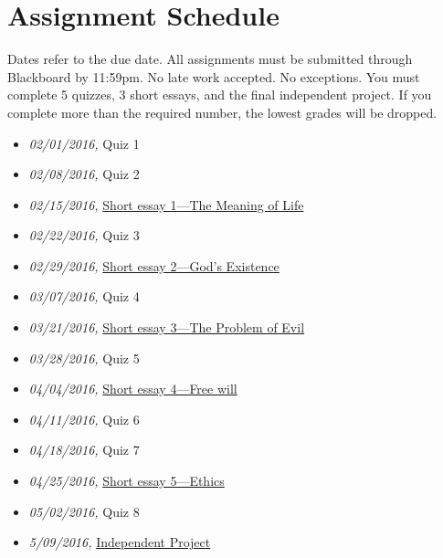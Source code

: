 \documentclass[article,oneside]{memoir}
\begin{document}
\section{ Assignment Schedule}
Dates refer to the due date. All assignments must be submitted through Blackboard by 11:59pm. No late work accepted. No exceptions. You must complete 5 quizzes, 3 short essays, and the final independent project. If you complete more than the required number, the lowest grades will be dropped.
\begin{itemize}
\item \textit{02/01/2016,} Quiz 1 
\item \textit{02/08/2016,} Quiz 2 
\item \textit{02/15/2016,} \href{http://scoconno.github.io/Teaching/Examined/Meaning/SW1/}{Short essay 1---The Meaning of Life} 
\item \textit{02/22/2016,} Quiz 3 
\item \textit{02/29/2016,} \href{http://scoconno.github.io/Teaching/Examined/God/SW2/}{Short essay 2---God's Existence}
\item \textit{03/07/2016,} Quiz 4
\item \textit{03/21/2016,}  \href{http://scoconno.github.io/Teaching/Examined/God/SW3}{Short essay 3---The Problem of Evil}
\item \textit{03/28/2016,} Quiz 5 
\item \textit{04/04/2016,}  \href{http://scoconno.github.io/Teaching/Examined/FreeWill/SW/}{Short essay 4---Free will}
\item \textit{04/11/2016,} Quiz 6
\item \textit{04/18/2016,} Quiz 7
\item \textit{04/25/2016,} \href{http://scoconno.github.io/Teaching/Examined/Ethics/Essay/}{Short essay 5---Ethics}
\item \textit{05/02/2016,} Quiz 8
\item \textit{5/09/2016,} \href{http://scoconno.github.io/Teaching/Examined/Applied/Essay/}{Independent Project}
\end{itemize}






\end{document}
